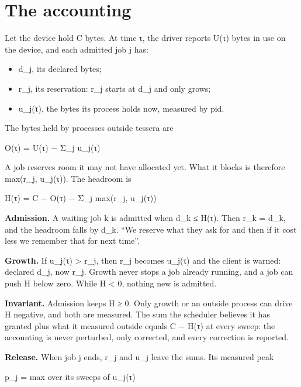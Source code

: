 \section{\texorpdfstring{The accounting}{The accounting}}

Let the device hold C bytes. At time τ, the driver reports U(τ) bytes in use on the device, and each admitted job j has:

\begin{itemize}
\item d\_\allowbreak{}j, its declared bytes;
\item r\_\allowbreak{}j, its reservation: r\_\allowbreak{}j starts at d\_\allowbreak{}j and only grows;
\item u\_\allowbreak{}j(τ), the bytes its process holds now, measured by pid.
\end{itemize}

The bytes held by processes outside tessera are

O(τ) = U(τ) − Σ\_\allowbreak{}j u\_\allowbreak{}j(τ)

A job reserves room it may not have allocated yet. What it blocks is therefore max(r\_\allowbreak{}j, u\_\allowbreak{}j(τ)). The headroom is

H(τ) = C − O(τ) − Σ\_\allowbreak{}j max(r\_\allowbreak{}j, u\_\allowbreak{}j(τ))

\textbf{Admission.} A waiting job k is admitted when d\_\allowbreak{}k ≤ H(τ). Then r\_\allowbreak{}k = d\_\allowbreak{}k, and the headroom falls by d\_\allowbreak{}k. “We reserve what they ask for and then if it cost less we remember that for next time”.

\textbf{Growth.} If u\_\allowbreak{}j(τ) > r\_\allowbreak{}j, then r\_\allowbreak{}j becomes u\_\allowbreak{}j(τ) and the client is warned: declared d\_\allowbreak{}j, now r\_\allowbreak{}j. Growth never stops a job already running, and a job can push H below zero. While H < 0, nothing new is admitted.

\textbf{Invariant.} Admission keeps H ≥ 0. Only growth or an outside process can drive H negative, and both are measured. The sum the scheduler believes it has granted plus what it measured outside equals C − H(τ) at every sweep: the accounting is never perturbed, only corrected, and every correction is reported.

\textbf{Release.} When job j ends, r\_\allowbreak{}j and u\_\allowbreak{}j leave the sums. Its measured peak

p\_\allowbreak{}j = max over its sweeps of u\_\allowbreak{}j(τ)

